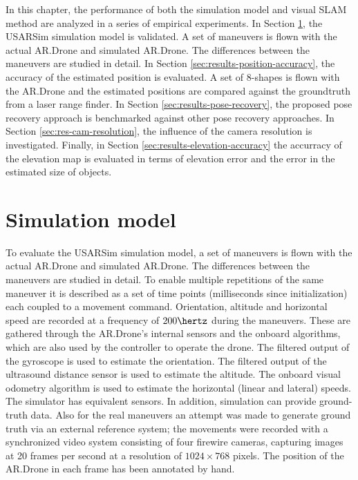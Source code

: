 In this chapter, the performance of both the simulation model and visual SLAM method are analyzed in a series of empirical experiments.
In Section \ref{sec:simulation_results}, the USARSim simulation model is validated.
A set of maneuvers is flown with the actual AR.Drone and
simulated AR.Drone. The differences between the maneuvers are studied in detail.
In Section \ref{sec:results-position-accuracy}, the accuracy of the estimated position is evaluated.
A set of 8-shapes is flown with the AR.Drone and the estimated positions are compared against the groundtruth from a laser range finder.
In Section \ref{sec:results-pose-recovery}, the proposed pose recovery approach is benchmarked against other pose recovery approaches.
In Section \ref{sec:res-cam-resolution}, the influence of the camera resolution is investigated.
Finally, in Section \ref{sec:results-elevation-accuracy} the accurracy of the elevation map is evaluated in terms of elevation error and the error in the estimated size of objects.


	\section{Simulation model}
\label{sec:simulation_results}
To evaluate the USARSim simulation model,  
a set of maneuvers is flown with the actual AR.Drone and
simulated AR.Drone. The differences between the maneuvers are studied in detail. To enable multiple repetitions of the same maneuver it is
described as a set of time points (milliseconds since initialization) each coupled to a movement command.
Orientation, altitude and horizontal speed are recorded at a frequency of $200\hertz$ during the maneuvers. These are gathered through the AR.Drone's internal sensors and the onboard algorithms, which are
also used by the controller to operate the drone. The filtered output of the gyroscope is used
to estimate the orientation. The filtered output of the ultrasound distance sensor is used to estimate
the altitude. The onboard visual odometry algorithm is used to estimate the horizontal (linear
and lateral) speeds. The simulator has equivalent sensors. In addition, simulation can provide ground-truth data. 
Also for the real maneuvers an attempt was made to generate ground truth via an external reference system; the movements were recorded with a synchronized video system consisting of four firewire cameras, capturing images at 20 frames per second at a resolution of $1024 \times 768$ pixels. The position of the AR.Drone 
in each frame has been annotated by hand. 

